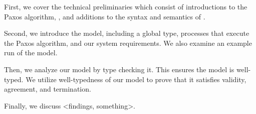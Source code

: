 First, we cover the technical preliminaries which consist of introductions to the Paxos algorithm, \FTMPST, and additions to the syntax and semantics of \FTMPST.

Second, we introduce the model, including a global type, processes that execute the Paxos algorithm, and our system requirements.
We also examine an example run of the model.

Then, we analyze our model by type checking it.
This ensures the model is well-typed.
We utilize well-typedness of our model to prove that it satisfies validity, agreement, and termination.

Finally, we discuss <findings, something>.




